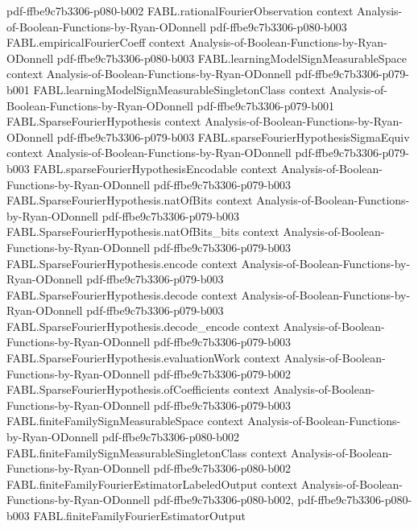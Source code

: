 \begin{theorem}
  {pdf-ffbe9c7b3306-p080-b002}
\proofstep
  {FABL.rationalFourierObservation}
  {context}
  {Analysis-of-Boolean-Functions-by-Ryan-ODonnell}
  {pdf-ffbe9c7b3306-p080-b003}
\proofstep
  {FABL.empiricalFourierCoeff}
  {context}
  {Analysis-of-Boolean-Functions-by-Ryan-ODonnell}
  {pdf-ffbe9c7b3306-p080-b003}
\proofstep
  {FABL.learningModelSignMeasurableSpace}
  {context}
  {Analysis-of-Boolean-Functions-by-Ryan-ODonnell}
  {pdf-ffbe9c7b3306-p079-b001}
\proofstep
  {FABL.learningModelSignMeasurableSingletonClass}
  {context}
  {Analysis-of-Boolean-Functions-by-Ryan-ODonnell}
  {pdf-ffbe9c7b3306-p079-b001}
\proofstep
  {FABL.SparseFourierHypothesis}
  {context}
  {Analysis-of-Boolean-Functions-by-Ryan-ODonnell}
  {pdf-ffbe9c7b3306-p079-b003}
\proofstep
  {FABL.sparseFourierHypothesisSigmaEquiv}
  {context}
  {Analysis-of-Boolean-Functions-by-Ryan-ODonnell}
  {pdf-ffbe9c7b3306-p079-b003}
\proofstep
  {FABL.sparseFourierHypothesisEncodable}
  {context}
  {Analysis-of-Boolean-Functions-by-Ryan-ODonnell}
  {pdf-ffbe9c7b3306-p079-b003}
\proofstep
  {FABL.SparseFourierHypothesis.natOfBits}
  {context}
  {Analysis-of-Boolean-Functions-by-Ryan-ODonnell}
  {pdf-ffbe9c7b3306-p079-b003}
\proofstep
  {FABL.SparseFourierHypothesis.natOfBits_bits}
  {context}
  {Analysis-of-Boolean-Functions-by-Ryan-ODonnell}
  {pdf-ffbe9c7b3306-p079-b003}
\proofstep
  {FABL.SparseFourierHypothesis.encode}
  {context}
  {Analysis-of-Boolean-Functions-by-Ryan-ODonnell}
  {pdf-ffbe9c7b3306-p079-b003}
\proofstep
  {FABL.SparseFourierHypothesis.decode}
  {context}
  {Analysis-of-Boolean-Functions-by-Ryan-ODonnell}
  {pdf-ffbe9c7b3306-p079-b003}
\proofstep
  {FABL.SparseFourierHypothesis.decode_encode}
  {context}
  {Analysis-of-Boolean-Functions-by-Ryan-ODonnell}
  {pdf-ffbe9c7b3306-p079-b003}
\proofstep
  {FABL.SparseFourierHypothesis.evaluationWork}
  {context}
  {Analysis-of-Boolean-Functions-by-Ryan-ODonnell}
  {pdf-ffbe9c7b3306-p079-b002}
\proofstep
  {FABL.SparseFourierHypothesis.ofCoefficients}
  {context}
  {Analysis-of-Boolean-Functions-by-Ryan-ODonnell}
  {pdf-ffbe9c7b3306-p079-b003}
\proofstep
  {FABL.finiteFamilySignMeasurableSpace}
  {context}
  {Analysis-of-Boolean-Functions-by-Ryan-ODonnell}
  {pdf-ffbe9c7b3306-p080-b002}
\proofstep
  {FABL.finiteFamilySignMeasurableSingletonClass}
  {context}
  {Analysis-of-Boolean-Functions-by-Ryan-ODonnell}
  {pdf-ffbe9c7b3306-p080-b002}
\proofstep
  {FABL.finiteFamilyFourierEstimatorLabeledOutput}
  {context}
  {Analysis-of-Boolean-Functions-by-Ryan-ODonnell}
  {pdf-ffbe9c7b3306-p080-b002,
    pdf-ffbe9c7b3306-p080-b003}
\proofstep
  {FABL.finiteFamilyFourierEstimatorOutput}

\end{theorem}
